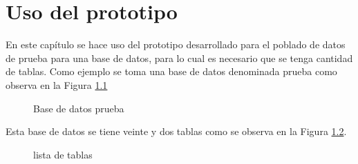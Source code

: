 \chapter{Uso del prototipo}
En este cap\'itulo se hace uso del prototipo desarrollado para el poblado de datos de prueba para una base de datos, para lo cual es necesario que se tenga cantidad de tablas.
Como ejemplo se toma una base de datos denominada prueba como observa en la Figura \ref{fig:createDatabase}

\begin{figure}[H]
\caption{Base de datos prueba} \label{fig:createDatabase}
\centering
{}
\end{figure}

Esta base de datos se tiene veinte y dos tablas como se observa en la Figura \ref{fig:listatablePrueba}. 
\begin{figure}[H]
\caption{lista de tablas} \label{fig:listatablePrueba}
\centering
{}
\end{figure}

